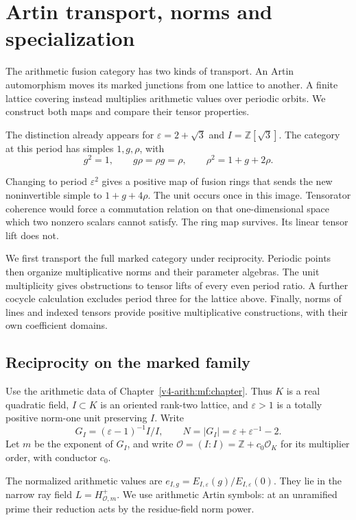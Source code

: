 \chapter{Artin transport, norms and specialization}
\label{v4-arith:at:chapter}

The arithmetic fusion category has two kinds of transport.
An Artin automorphism moves its marked junctions from one lattice
to another. A finite lattice covering instead multiplies
arithmetic values over periodic orbits. We construct both maps
and compare their tensor properties.

The distinction already appears for \(\varepsilon=2+\sqrt3\)
and \(I=\mathbb Z[\sqrt3]\). The category at this period has
simples \(1,g,\rho\), with
\[
 g^2=1,\qquad g\rho=\rho g=\rho,\qquad
 \rho^2=1+g+2\rho.
\]

Changing to period \(\varepsilon^2\) gives a positive map of
fusion rings that sends the new noninvertible simple to
\(1+g+4\rho\). The unit occurs once in this image.
Tensorator coherence would force a commutation relation on that
one-dimensional space which two nonzero scalars cannot satisfy.
The ring map survives. Its linear tensor lift does not.

We first transport the full marked category under reciprocity.
Periodic points then organize multiplicative norms and their
parameter algebras. The unit multiplicity gives obstructions to
tensor lifts of every even period ratio. A further cocycle
calculation excludes period three for the lattice above.
Finally, norms of lines and indexed tensors provide positive
multiplicative constructions, with their own coefficient domains.

\section{Reciprocity on the marked family}
\label{v4-arith:at:family}

Use the arithmetic data of Chapter~\ref{v4-arith:mf:chapter}.
Thus \(K\) is a real quadratic field, \(I\subset K\) is an
oriented rank-two lattice, and \(\varepsilon>1\) is a totally
positive norm-one unit preserving \(I\). Write
\[
 G_I=(\varepsilon-1)^{-1}I/I,\qquad
 N=|G_I|=\varepsilon+\varepsilon^{-1}-2.
\]
Let \(m\) be the exponent of \(G_I\), and write
\(\mathcal O=(I:I)=\mathbb Z+c_0\mathcal O_K\) for its multiplier
order, with conductor \(c_0\).

The normalized arithmetic values are
\(e_{I,g}=E_{I,\varepsilon}(g)/E_{I,\varepsilon}(0)\).
They lie in the narrow ray field \(L=H^+_{\mathcal O,m}\).
We use arithmetic Artin symbols: at an unramified prime their
reduction acts by the residue-field norm power.

